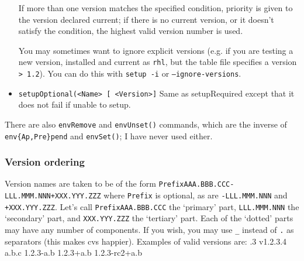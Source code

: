 \documentclass{article}
\newcommand{\code}[1]{\texttt{#1}}
\let\overbatim=\verbatim
\let\oendverbatim=\endverbatim
\renewenvironment{verbatim}
{\center\minipage{16cm}\overbatim}
{\oendverbatim\endminipage\endcenter}
\begin{document}
\begin{itemize}
    If more than one version matches the specified condition, priority is
    given to the version declared current;  if there is no current
    version, or it doesn't satisfy the condition, the highest valid version number
    is used.

    You may sometimes want to ignore explicit versions (e.g. if you are testing
    a new version, installed and current as \code{rhl}, but the table file specifies a
    version \code{> 1.2}).  You can do this with \code{setup -i} or \code{--ignore-versions}.

   \item \code{setupOptional(<Name> [ <Version>]}
     Same as setupRequired except that it does not fail if unable to setup.
\end{itemize}

There are also \code{envRemove} and \code{envUnset()} commands, which
are the inverse of \code{env\{Ap,Pre\}pend} and \code{envSet()}; I have
never used either.     

\subsubsection{Version ordering}
\label{versionOrdering}

Version names are taken to be of the form \code{PrefixAAA.BBB.CCC-LLL.MMM.NNN+XXX.YYY.ZZZ}
where \code{Prefix} is optional, as are \code{-LLL.MMM.NNN} and \code{+XXX.YYY.ZZZ}.  Let's call
\code{PrefixAAA.BBB.CCC} the `primary' part, \code{LLL.MMM.NNN} the `secondary' part, and \code{XXX.YYY.ZZZ}
the `tertiary' part.
Each of the `dotted' parts may have any number of components. If you wish, you may use \code{\_}
instead of \code{.} as separators (this makes cvs happier).  Examples of valid
versions are:
\begin{verbatim}
  1.2.3
  v1.2.3.4
  a.b.c
  1.2.3-a.b
  1.2.3+a.b
  1.2.3-rc2+a.b
\end{verbatim}
\end{document}
